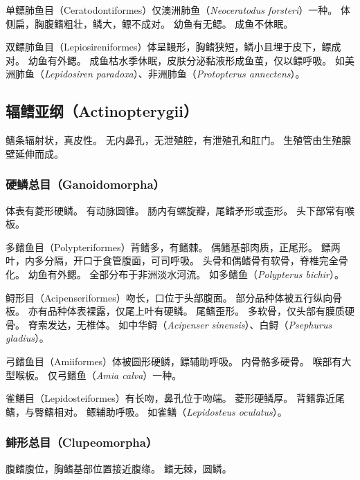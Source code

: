 \documentclass[11pt]{article}
\begin{document}
\newline

单鳔肺鱼目（Ceratodontiformes）仅澳洲肺鱼（\textit{Neoceratodus forsteri}）一种。
体侧扁，胸腹鳍粗壮，鳞大，鳔不成对。
幼鱼有无鳃。
成鱼不休眠。

\newline

双鳔肺鱼目（Lepiosireniformes）体呈鳗形，胸鳍狭短，鳞小且埋于皮下，鳔成对。
幼鱼有外鳃。
成鱼枯水季休眠，皮肤分泌黏液形成鱼茧，仅以鳔呼吸。
如美洲肺鱼（\textit{Lepidosiren paradoxa}）、非洲肺鱼（\textit{Protopterus annectens}）。

\subsection{辐鳍亚纲（Actinopterygii）}
鳍条辐射状，真皮性。
无内鼻孔，无泄殖腔，有泄殖孔和肛门。
生殖管由生殖腺壁延伸而成。

\subsubsection{硬鳞总目（Ganoidomorpha）}
体表有菱形硬鳞。
有动脉圆锥。
肠内有螺旋瓣，尾鳍矛形或歪形。
头下部常有喉板。

\newline

多鳍鱼目（Polypteriformes）背鳍多，有鳍棘。
偶鳍基部肉质，正尾形。
鳔两叶，内多分隔，开口于食管腹面，可司呼吸。
头骨和偶鳍骨有软骨，脊椎完全骨化。
幼鱼有外鳃。
全部分布于非洲淡水河流。
如多鳍鱼（\textit{Polypterus bichir}）。

\newline

鲟形目（Acipenseriformes）吻长，口位于头部腹面。
部分品种体被五行纵向骨板。
亦有品种体表裸露，仅尾上叶有硬鳞。
尾鳍歪形。
多软骨，仅头部有膜质硬骨。
脊索发达，无椎体。
如中华鲟（\textit{Acipenser sinensis}）、白鲟（\textit{Psephurus gladius}）。

\newline

弓鳍鱼目（Amiiformes）体被圆形硬鳞，鳔辅助呼吸。
内骨骼多硬骨。
喉部有大型喉板。
仅弓鳍鱼（\textit{Amia calva}）一种。

\newline

雀鳝目（Lepidosteiformes）有长吻，鼻孔位于吻端。
菱形硬鳞厚。
背鳍靠近尾鳍，与臀鳍相对。
鳔辅助呼吸。
如雀鳝（\textit{Lepidosteus oculatus}）。

\subsubsection{鲱形总目（Clupeomorpha）}
腹鳍腹位，胸鳍基部位置接近腹缘。
鳍无棘，圆鳞。
\end{document}
